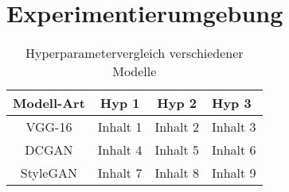 \section{Experimentierumgebung}
\begin{table}[h]
	\centering
	\begin{tabular}{|c|c|c|p{4cm}|}
		\hline
		\textbf{Modell-Art} & \textbf{Hyp 1} & \textbf{Hyp 2} & \textbf{Hyp 3} \\
		\hline
		VGG-16 & Inhalt 1 & Inhalt 2 & Inhalt 3 \\
		\hline
		DCGAN & Inhalt 4 & Inhalt 5 & Inhalt 6 \\
		\hline
		StyleGAN & Inhalt 7 & Inhalt 8 & Inhalt 9 \\
		\hline
	\end{tabular}
	\caption{Hyperparametervergleich verschiedener Modelle}
	\label{tab:hyper}
\end{table}